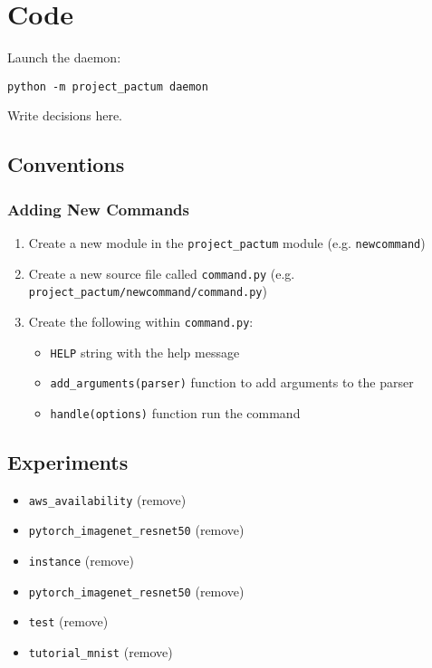\chapter{Code}
\label{chap:code}

Launch the daemon:

\noindent \lstinline|python -m project_pactum daemon|

Write decisions here.

\section{Conventions}

\subsection{Adding New Commands}

\begin{enumerate}
  \item Create a new module in the \lstinline|project_pactum| module (e.g. \lstinline|newcommand|)
  \item Create a new source file called \lstinline|command.py| (e.g. \lstinline|project_pactum/newcommand/command.py|)
  \item Create the following within \lstinline|command.py|:
    \begin{itemize}
      \item \lstinline|HELP| string with the help message
      \item \lstinline|add_arguments(parser)| function to add arguments to the parser
      \item \lstinline|handle(options)| function run the command
    \end{itemize}
\end{enumerate}

\section{Experiments}

\begin{itemize}
  \item \lstinline|aws_availability| {\color{solarizedRed}(remove)}
  \item \lstinline|pytorch_imagenet_resnet50| {\color{solarizedRed}(remove)}
  \item \lstinline|instance| {\color{solarizedRed}(remove)}
  \item \lstinline|pytorch_imagenet_resnet50| {\color{solarizedRed}(remove)}
  \item \lstinline|test| {\color{solarizedRed}(remove)}
  \item \lstinline|tutorial_mnist| {\color{solarizedRed}(remove)}
\end{itemize}
